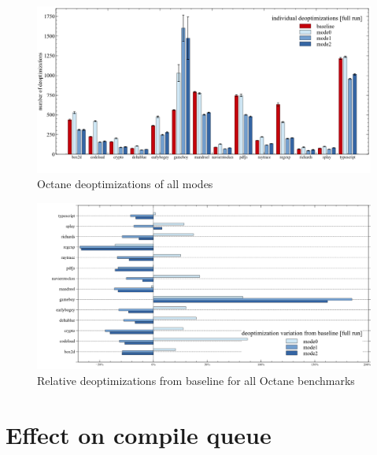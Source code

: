 \begin{figure}[ht]
  \begin{center}
    \centering
    \includegraphics[width=1.0\textwidth]{figures/octane_deopt.png}
    \caption{Octane deoptimizations of all modes} 
    \label{f:octane_deopt}
  \end{center}
\end{figure}



\begin{figure}[ht]
  \begin{center}
    \centering
    \includegraphics[width=1.0\textwidth]{figures/octane_variation_deopt.png}
    \caption{Relative deoptimizations from baseline for all Octane benchmarks}
    \label{f:octane_variation_deopt}
  \end{center}
\end{figure}

\clearpage
\section{Effect on compile queue}
\label{s:perf_compilequeue}

